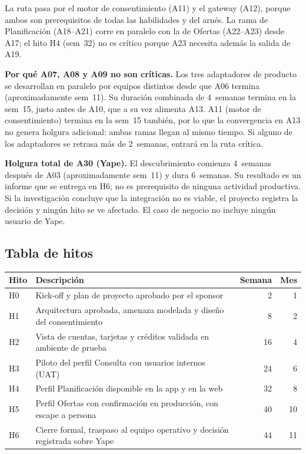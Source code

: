 \documentclass[11pt]{article}
\begin{document}
La ruta pasa por el motor de consentimiento (A11) y el gateway (A12), porque ambos son prerequisitos de todas las habilidades y del arnés. La rama de Planificación (A18–A21) corre en paralelo con la de Ofertas (A22–A23) desde A17; el hito H4 (sem~32) no es crítico porque A23 necesita además la salida de A19.

\textbf{Por qué A07, A08 y A09 no son críticas.} Los tres adaptadores de producto se desarrollan en paralelo por equipos distintos desde que A06 termina (aproximadamente sem~11). Su duración combinada de 4~semanas termina en la sem~15, justo antes de A10, que a su vez alimenta A13. A11 (motor de consentimiento) termina en la sem~15 también, por lo que la convergencia en A13 no genera holgura adicional: ambas ramas llegan al mismo tiempo. Si alguno de los adaptadores se retrasa más de 2~semanas, entrará en la ruta crítica.

\textbf{Holgura total de A30 (Yape).} El descubrimiento comienza 4~semanas después de A03 (aproximadamente sem~11) y dura 6~semanas. Su resultado es un informe que se entrega en H6; no es prerequisito de ninguna actividad productiva. Si la investigación concluye que la integración no es viable, el proyecto registra la decisión y ningún hito se ve afectado. El caso de negocio no incluye ningún usuario de Yape.

\subsection{Tabla de hitos}

\begin{tabularx}{\textwidth}{@{}l X r r@{}}
\toprule
\textbf{Hito} & \textbf{Descripción} & \textbf{Semana} & \textbf{Mes} \\
\midrule
H0 & Kick-off y plan de proyecto aprobado por el sponsor & 2  & 1  \\
H1 & Arquitectura aprobada, amenaza modelada y diseño del consentimiento & 8  & 2  \\
H2 & Vista de cuentas, tarjetas y créditos validada en ambiente de prueba & 16 & 4  \\
H3 & Piloto del perfil Consulta con usuarios internos (UAT) & 24 & 6  \\
H4 & Perfil Planificación disponible en la app y en la web & 32 & 8  \\
H5 & Perfil Ofertas con confirmación en producción, con escape a persona & 40 & 10 \\
H6 & Cierre formal, traspaso al equipo operativo y decisión registrada sobre Yape & 44 & 11 \\
\bottomrule
\end{tabularx}
\end{document}
